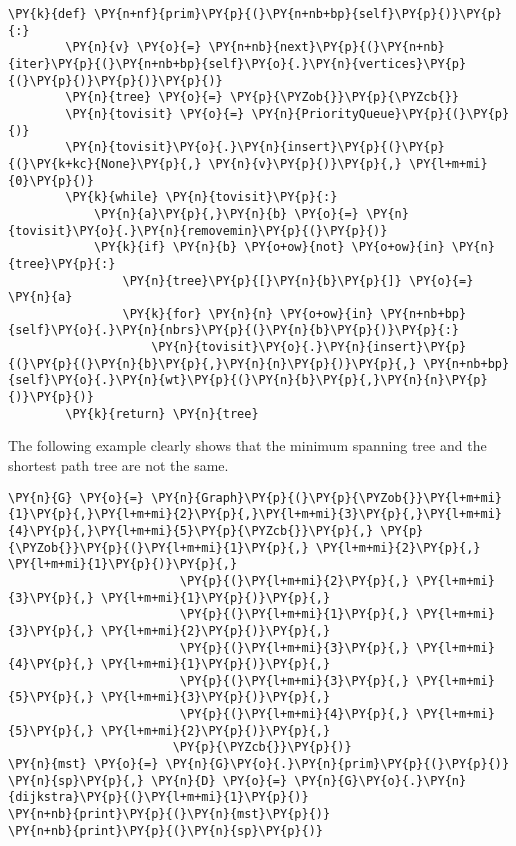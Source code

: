 \begin{Verbatim}[commandchars=\\\{\}]
    \PY{k}{def} \PY{n+nf}{prim}\PY{p}{(}\PY{n+nb+bp}{self}\PY{p}{)}\PY{p}{:}
        \PY{n}{v} \PY{o}{=} \PY{n+nb}{next}\PY{p}{(}\PY{n+nb}{iter}\PY{p}{(}\PY{n+nb+bp}{self}\PY{o}{.}\PY{n}{vertices}\PY{p}{(}\PY{p}{)}\PY{p}{)}\PY{p}{)}
        \PY{n}{tree} \PY{o}{=} \PY{p}{\PYZob{}}\PY{p}{\PYZcb{}}
        \PY{n}{tovisit} \PY{o}{=} \PY{n}{PriorityQueue}\PY{p}{(}\PY{p}{)}
        \PY{n}{tovisit}\PY{o}{.}\PY{n}{insert}\PY{p}{(}\PY{p}{(}\PY{k+kc}{None}\PY{p}{,} \PY{n}{v}\PY{p}{)}\PY{p}{,} \PY{l+m+mi}{0}\PY{p}{)}
        \PY{k}{while} \PY{n}{tovisit}\PY{p}{:}
            \PY{n}{a}\PY{p}{,}\PY{n}{b} \PY{o}{=} \PY{n}{tovisit}\PY{o}{.}\PY{n}{removemin}\PY{p}{(}\PY{p}{)}
            \PY{k}{if} \PY{n}{b} \PY{o+ow}{not} \PY{o+ow}{in} \PY{n}{tree}\PY{p}{:}
                \PY{n}{tree}\PY{p}{[}\PY{n}{b}\PY{p}{]} \PY{o}{=} \PY{n}{a}
                \PY{k}{for} \PY{n}{n} \PY{o+ow}{in} \PY{n+nb+bp}{self}\PY{o}{.}\PY{n}{nbrs}\PY{p}{(}\PY{n}{b}\PY{p}{)}\PY{p}{:}
                    \PY{n}{tovisit}\PY{o}{.}\PY{n}{insert}\PY{p}{(}\PY{p}{(}\PY{n}{b}\PY{p}{,}\PY{n}{n}\PY{p}{)}\PY{p}{,} \PY{n+nb+bp}{self}\PY{o}{.}\PY{n}{wt}\PY{p}{(}\PY{n}{b}\PY{p}{,}\PY{n}{n}\PY{p}{)}\PY{p}{)}
        \PY{k}{return} \PY{n}{tree}
\end{Verbatim}



The following example clearly shows that the minimum spanning tree and the shortest path tree are not the same.


\begin{Verbatim}[commandchars=\\\{\}]
\PY{n}{G} \PY{o}{=} \PY{n}{Graph}\PY{p}{(}\PY{p}{\PYZob{}}\PY{l+m+mi}{1}\PY{p}{,}\PY{l+m+mi}{2}\PY{p}{,}\PY{l+m+mi}{3}\PY{p}{,}\PY{l+m+mi}{4}\PY{p}{,}\PY{l+m+mi}{5}\PY{p}{\PYZcb{}}\PY{p}{,} \PY{p}{\PYZob{}}\PY{p}{(}\PY{l+m+mi}{1}\PY{p}{,} \PY{l+m+mi}{2}\PY{p}{,} \PY{l+m+mi}{1}\PY{p}{)}\PY{p}{,}
                        \PY{p}{(}\PY{l+m+mi}{2}\PY{p}{,} \PY{l+m+mi}{3}\PY{p}{,} \PY{l+m+mi}{1}\PY{p}{)}\PY{p}{,}
                        \PY{p}{(}\PY{l+m+mi}{1}\PY{p}{,} \PY{l+m+mi}{3}\PY{p}{,} \PY{l+m+mi}{2}\PY{p}{)}\PY{p}{,}
                        \PY{p}{(}\PY{l+m+mi}{3}\PY{p}{,} \PY{l+m+mi}{4}\PY{p}{,} \PY{l+m+mi}{1}\PY{p}{)}\PY{p}{,}
                        \PY{p}{(}\PY{l+m+mi}{3}\PY{p}{,} \PY{l+m+mi}{5}\PY{p}{,} \PY{l+m+mi}{3}\PY{p}{)}\PY{p}{,}
                        \PY{p}{(}\PY{l+m+mi}{4}\PY{p}{,} \PY{l+m+mi}{5}\PY{p}{,} \PY{l+m+mi}{2}\PY{p}{)}\PY{p}{,}
                       \PY{p}{\PYZcb{}}\PY{p}{)}
\PY{n}{mst} \PY{o}{=} \PY{n}{G}\PY{o}{.}\PY{n}{prim}\PY{p}{(}\PY{p}{)}
\PY{n}{sp}\PY{p}{,} \PY{n}{D} \PY{o}{=} \PY{n}{G}\PY{o}{.}\PY{n}{dijkstra}\PY{p}{(}\PY{l+m+mi}{1}\PY{p}{)}
\PY{n+nb}{print}\PY{p}{(}\PY{n}{mst}\PY{p}{)}
\PY{n+nb}{print}\PY{p}{(}\PY{n}{sp}\PY{p}{)}
\end{Verbatim}

